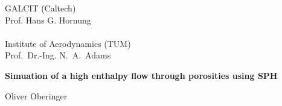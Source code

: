 


% 

\pagestyle{empty}

\begin{center}

\vspace*{-2.8cm}
\begin{minipage}[c]{.30\textwidth}
\end{minipage}
\begin{minipage}[c]{.43\textwidth}
\vspace*{1em}
    {GALCIT (Caltech)\\Prof. Hans G. Hornung \\ \\ Institute of Aerodynamics (TUM) \\ Prof.~Dr.-Ing. N.~A.~Adams}%
\end{minipage}
\begin{minipage}[c]{.25\textwidth}
\end{minipage}

\vspace*{3.3cm}
\begin{minipage}[c]{11cm}
{\LARGE\bf 
Simuation of a high enthalpy flow through porosities using SPH}
\end{minipage}

\vspace*{0.8cm}
Oliver Oberinger\\


\end{center}
